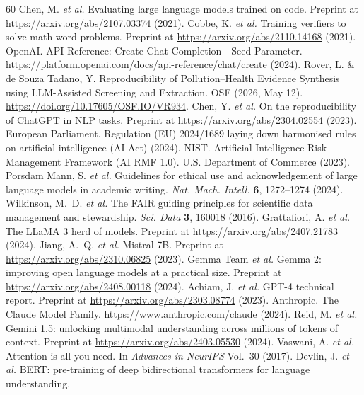 \documentclass[sn-nature]{sn-jnl}
\begin{document}
\begin{thebibliography}{60}
Chen, M. \emph{et al.}
Evaluating large language models trained on code.
Preprint at \url{https://arxiv.org/abs/2107.03374} (2021).
Cobbe, K. \emph{et al.}
Training verifiers to solve math word problems.
Preprint at \url{https://arxiv.org/abs/2110.14168} (2021).
OpenAI. API Reference: Create Chat Completion---Seed Parameter.
\url{https://platform.openai.com/docs/api-reference/chat/create} (2024).
Rover, L. \& de Souza Tadano, Y.
Reproducibility of Pollution--Health Evidence Synthesis using LLM-Assisted Screening and Extraction.
OSF (2026, May 12). \url{https://doi.org/10.17605/OSF.IO/VR934}.
Chen, Y. \emph{et al.}
On the reproducibility of ChatGPT in NLP tasks.
Preprint at \url{https://arxiv.org/abs/2304.02554} (2023).
European Parliament.
Regulation (EU) 2024/1689 laying down harmonised rules on artificial intelligence (AI Act) (2024).
NIST.
Artificial Intelligence Risk Management Framework (AI RMF 1.0).
U.S. Department of Commerce (2023).
Porsdam Mann, S. \emph{et al.}
Guidelines for ethical use and acknowledgement of large language models in academic writing.
\emph{Nat. Mach. Intell.} \textbf{6}, 1272--1274 (2024).
Wilkinson, M.~D. \emph{et al.}
The FAIR guiding principles for scientific data management and stewardship.
\emph{Sci. Data} \textbf{3}, 160018 (2016).
Grattafiori, A. \emph{et al.}
The LLaMA 3 herd of models.
Preprint at \url{https://arxiv.org/abs/2407.21783} (2024).
Jiang, A.~Q. \emph{et al.}
Mistral 7B.
Preprint at \url{https://arxiv.org/abs/2310.06825} (2023).
Gemma Team \emph{et al.}
Gemma 2: improving open language models at a practical size.
Preprint at \url{https://arxiv.org/abs/2408.00118} (2024).
Achiam, J. \emph{et al.}
GPT-4 technical report.
Preprint at \url{https://arxiv.org/abs/2303.08774} (2023).
Anthropic.
The Claude Model Family.
\url{https://www.anthropic.com/claude} (2024).
Reid, M. \emph{et al.}
Gemini 1.5: unlocking multimodal understanding across millions of tokens of context.
Preprint at \url{https://arxiv.org/abs/2403.05530} (2024).
Vaswani, A. \emph{et al.}
Attention is all you need.
In \emph{Advances in NeurIPS} Vol.~30 (2017).
Devlin, J. \emph{et al.}
BERT: pre-training of deep bidirectional transformers for language understanding.

\end{thebibliography}
\end{document}
